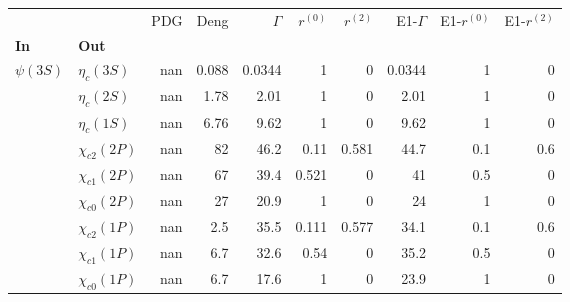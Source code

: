 \begin{tabular}{l|l|r|r|r|r|r|r|r|r}
\toprule
           &                 &  PDG &  Deng &  $\Gamma$ &  $r^{(0)}$ &  $r^{(2)}$ &  E1-$\Gamma$ &  E1-$r^{(0)}$ &  E1-$r^{(2)}$ \\
\textbf{In} & \textbf{Out} &      &       &           &            &            &              &               &               \\
\midrule
\textbf{$\psi(3S)$} & \textbf{$\eta_{c}(3S)$} &  nan & 0.088 &    0.0344 &          1 &          0 &       0.0344 &             1 &             0 \\
           & \textbf{$\eta_{c}(2S)$} &  nan &  1.78 &      2.01 &          1 &          0 &         2.01 &             1 &             0 \\
           & \textbf{$\eta_{c}(1S)$} &  nan &  6.76 &      9.62 &          1 &          0 &         9.62 &             1 &             0 \\
           & \textbf{$\chi_{c2}(2P)$} &  nan &    82 &      46.2 &       0.11 &      0.581 &         44.7 &           0.1 &           0.6 \\
           & \textbf{$\chi_{c1}(2P)$} &  nan &    67 &      39.4 &      0.521 &          0 &           41 &           0.5 &             0 \\
           & \textbf{$\chi_{c0}(2P)$} &  nan &    27 &      20.9 &          1 &          0 &           24 &             1 &             0 \\
           & \textbf{$\chi_{c2}(1P)$} &  nan &   2.5 &      35.5 &      0.111 &      0.577 &         34.1 &           0.1 &           0.6 \\
           & \textbf{$\chi_{c1}(1P)$} &  nan &   6.7 &      32.6 &       0.54 &          0 &         35.2 &           0.5 &             0 \\
           & \textbf{$\chi_{c0}(1P)$} &  nan &   6.7 &      17.6 &          1 &          0 &         23.9 &             1 &             0 \\
\bottomrule
\end{tabular}
